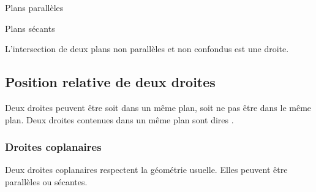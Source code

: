 \begin{multicols}{2}

    \begin{center}
        Plans parallèles
    \end{center}
    
\columnbreak

    \begin{center}

    \end{center}


\end{multicols}

\begin{multicols}{2}
    \begin{center}
        Plans sécants
    \end{center}
    L'intersection de deux plans non parallèles et non confondus est une droite.

    \columnbreak

    \begin{center}

    \end{center}

\end{multicols}

\subsection{Position relative de deux droites}

Deux droites peuvent être soit dans un même plan, soit ne pas être dans le même plan. Deux droites contenues dans un même plan sont dires .

\subsubsection{Droites coplanaires}

Deux droites coplanaires respectent la géométrie usuelle. Elles peuvent être parallèles ou sécantes.

